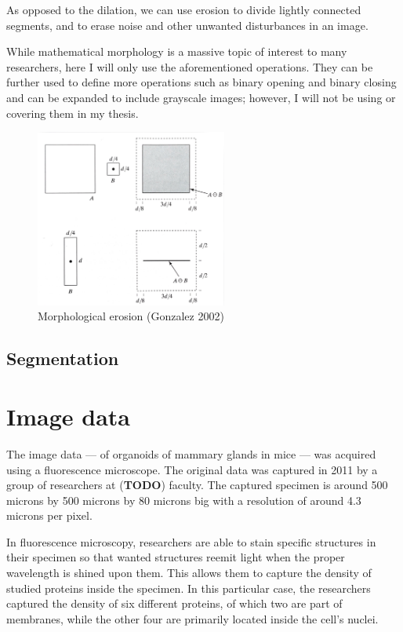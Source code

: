 \documentclass[
  digital,     %
  oneside,     %
  nosansbold,  %
  nocolorbold, %
  lof,         %
  lot,         %
]{fithesis4}
\begin{document}
As opposed to the dilation, we can use erosion to divide lightly connected
segments, and to erase noise and other unwanted disturbances in an image.

While mathematical morphology is a massive topic of interest to many
researchers, here I will only use the aforementioned operations. They can be
further used to define more operations such as binary opening and binary closing
and can be expanded to include grayscale images; however, I will not be using or covering
them in my thesis.

\begin{figure}
    \begin{center}
        \includegraphics[width=6.3cm]{resources/morph_erosion.jpg}
    \end{center}
    \caption{Morphological erosion (Gonzalez 2002)} %
    \label{fig:morph_erosion}
\end{figure}

\section{Segmentation}

\chapter{Image data}

The image data --- of organoids of mammary glands in mice --- was acquired using
a fluorescence microscope. The original data was captured in 2011 by a group of
researchers at (\textbf{TODO}) faculty. The captured specimen is around 500
microns by 500 microns by 80 microns big with a resolution of around 4.3 microns
per pixel.

In fluorescence microscopy, researchers are able to stain specific structures in
their specimen so that wanted structures reemit light when the proper wavelength
is shined upon them. This allows them to capture the density of studied proteins
inside the specimen. In this particular case, the researchers captured the
density of six different proteins, of which two are part of membranes, while the
other four are primarily located inside the cell's nuclei.
\end{document}
